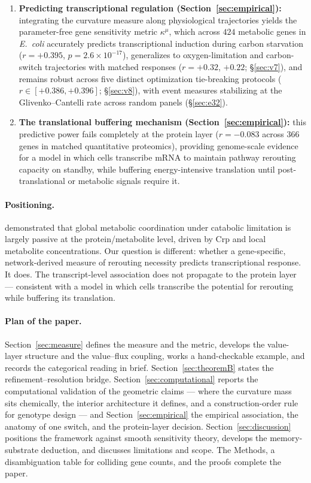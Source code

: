 \documentclass[11pt,a4paper]{article}
\theoremstyle{plain}
\theoremstyle{definition}
\theoremstyle{remark}
\newcommand{\kmu}{\kappa^{\mu}}
\begin{document}
\begin{enumerate}[label=(\roman*)]
\item \textbf{Predicting transcriptional regulation
      (Section~\ref{sec:empirical}):} integrating the curvature
      measure along physiological trajectories yields the
      parameter-free gene sensitivity metric $\kmu$, which across
      $424$ metabolic genes in \emph{E.~coli} accurately predicts
      transcriptional induction during carbon starvation
      ($r = +0.395$, $p = 2.6 \times 10^{-17}$), generalizes to
      oxygen-limitation and carbon-switch trajectories with matched
      responses ($r = +0.32$, $+0.22$; \S\ref{sec:v7}), and remains
      robust across five distinct optimization tie-breaking protocols
      ($r \in [+0.386, +0.396]$; \S\ref{sec:v8}), with event measures
      stabilizing at the Glivenko--Cantelli rate across random panels
      (\S\ref{sec:e32}).
\item \textbf{The translational buffering mechanism
      (Section~\ref{sec:empirical}):} this predictive power fails
      completely at the protein layer ($r = -0.083$ across $366$ genes
      in matched quantitative proteomics), providing genome-scale
      evidence for a model in which cells transcribe mRNA to maintain
      pathway rerouting capacity on standby, while buffering
      energy-intensive translation until post-translational or
      metabolic signals require it.
\end{enumerate}

\paragraph{Positioning.}
\citet{kochanowski2013} demonstrated that global metabolic coordination under
catabolic limitation is largely passive at the protein/metabolite level,
driven by Crp and local metabolite concentrations. Our question is different: whether a gene-specific, network-derived
measure of rerouting necessity predicts transcriptional response. It
does. The transcript-level association does not
propagate to the protein layer --- consistent with a model in
which cells transcribe the potential for rerouting while buffering
its translation.

\paragraph{Plan of the paper.}
Section~\ref{sec:measure} defines the measure and the metric, develops
the value-layer structure and the value--flux coupling, works a
hand-checkable example, and records the categorical reading in brief.
Section~\ref{sec:theoremB} states the
refinement--resolution bridge. Section~\ref{sec:computational} reports
the computational validation of the geometric claims --- where the
curvature mass sits chemically, the interior architecture it defines,
and a construction-order rule for genotype design --- and
Section~\ref{sec:empirical} the empirical association, the anatomy of
one switch, and the protein-layer decision.
Section~\ref{sec:discussion} positions the framework against smooth
sensitivity theory, develops the memory-substrate deduction, and
discusses limitations and scope. The Methods, a disambiguation table for
colliding gene counts, and the proofs complete the paper.
\end{document}
